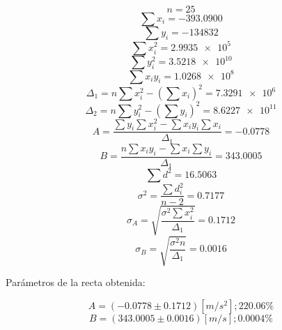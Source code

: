 \documentclass[letter,11pt]{article}
\begin{document}
\begin{equation*}
    n = 25
\end{equation*}
\begin{equation*}
    \sum x_i = -393.0900
\end{equation*}
\begin{equation*}
    \sum y_i = -134832
\end{equation*}
\begin{equation*}
    \sum x^2_i = \num{2.9935e5}
\end{equation*}
\begin{equation*}
    \sum y^2_i = \num{3.5218e10}
\end{equation*}
\begin{equation*}
    \sum x_i y_i = \num{1.0268e8}
\end{equation*}
\begin{equation*}
    \Delta_1 = n \sum x^2_i - \left( \sum x_i \right)^2 = \num{7.3291e6}
\end{equation*}
\begin{equation*}
    \Delta_2 = n \sum y^2_i - \left( \sum y_i \right)^2 = \num{8.6227e11}
\end{equation*}
\begin{equation*}
    A = \frac{\sum y_i \sum x^2_i - \sum x_i y_i \sum x_i}{\Delta_1} = -0.0778
\end{equation*}
\begin{equation*}
    B = \frac{n \sum x_i y_i - \sum x_i \sum y_i}{\Delta_1} = 343.0005
\end{equation*}
\begin{equation*}
    \sum d^2 = 16.5063
\end{equation*}
\begin{equation*}
    \sigma^2 = \frac{\sum d^2_i}{n-2} = 0.7177
\end{equation*}
\begin{equation*}
    \sigma_A = \sqrt{\frac{\sigma^2 \sum x^2_i}{\Delta_1}} = 0.1712
\end{equation*}
\begin{equation*}
    \sigma_B = \sqrt{\frac{\sigma^2 n}{\Delta_1}} = 0.0016
\end{equation*}
\vspace{0.10cm}

Parámetros de la recta obtenida:

\begin{equation*}
    A = (-0.0778 \pm 0.1712) [m/s^2]; 220.06\%
\end{equation*}
\begin{equation*}
    B = (343.0005 \pm 0.0016) [m/s]; 0.0004\%
\end{equation*}
\vspace{0.10cm}
\end{document}
